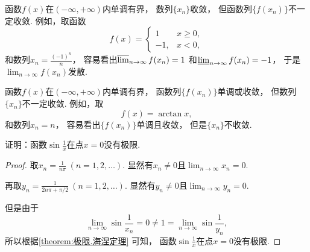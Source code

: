 \begin{example}
函数\(f(x)\)在\((-\infty,+\infty)\)内单调有界，
数列\(\{x_n\}\)收敛，
但函数列\(\{f(x_n)\}\)不一定收敛.
例如，取函数\[
	f(x) = \left\{ \begin{array}{rl}
		1 & x\geq0, \\
		-1, & x<0,
	\end{array} \right.
\]
和数列\(x_n = \frac{(-1)^n}{n}\)，
容易看出\(\varlimsup_{n\to\infty} f(x_n) = 1\)
和\(\varliminf_{n\to\infty} f(x_n) = -1\)，
于是\(\lim_{n\to\infty} f(x_n)\)发散.
\end{example}

\begin{example}
函数\(f(x)\)在\((-\infty,+\infty)\)内单调有界，
函数列\(\{f(x_n)\}\)单调或收敛，
但数列\(\{x_n\}\)不一定收敛.
例如，取\[
	f(x) = \arctan x,
\]
和数列\(x_n = n\)，
容易看出\(\{f(x_n)\}\)单调且收敛，
但是\(\{x_n\}\)不收敛.
\end{example}

\begin{example}
证明：函数\(\sin\frac1x\)在点\(x=0\)没有极限.
\begin{proof}
取\(x_n = \frac1{n\pi}\ (n=1,2,\dotsc)\).
显然有\(x_n\neq0\)且\(\lim_{n\to\infty} x_n = 0\).

再取\(y_n = \frac1{2n\pi+\pi/2}\ (n=1,2,\dotsc)\).
显然有\(y_n\neq0\)且\(\lim_{n\to\infty} y_n = 0\).

但是由于\[
	\lim_{n\to\infty} \sin\frac1{x_n} = 0
	\neq 1 = \lim_{n\to\infty} \sin\frac1{y_n},
\]
所以根据\cref{theorem:极限.海涅定理} 可知，
函数\(\sin\frac1x\)在点\(x=0\)没有极限.
\end{proof}
\end{example}

